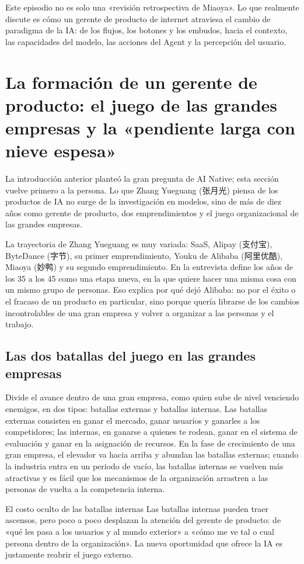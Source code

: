 \documentclass[a4paper]{article}
\begin{document}
Este episodio no es solo una «revisión retrospectiva de Miaoya». Lo que realmente discute es cómo un gerente de producto de internet atraviesa el cambio de paradigma de la IA: de los flujos, los botones y los embudos, hacia el contexto, las capacidades del modelo, las acciones del Agent y la percepción del usuario.
\section{La formación de un gerente de producto: el juego de las grandes empresas y la «pendiente larga con nieve espesa»}

La introducción anterior planteó la gran pregunta de AI Native; esta sección vuelve primero a la persona. Lo que Zhang Yueguang (张月光) piensa de los productos de IA no surge de la investigación en modelos, sino de más de diez años como gerente de producto, dos emprendimientos y el juego organizacional de las grandes empresas.

La trayectoria de Zhang Yueguang es muy variada: SaaS, Alipay (支付宝), ByteDance (字节), su primer emprendimiento, Youku de Alibaba (阿里优酷), Miaoya (妙鸭) y su segundo emprendimiento. En la entrevista define los años de los 35 a los 45 como una etapa nueva, en la que quiere hacer una misma cosa con un mismo grupo de personas. Eso explica por qué dejó Alibaba: no por el éxito o el fracaso de un producto en particular, sino porque quería librarse de los cambios incontrolables de una gran empresa y volver a organizar a las personas y el trabajo.

\subsection{Las dos batallas del juego en las grandes empresas}

Divide el avance dentro de una gran empresa, como quien sube de nivel venciendo enemigos, en dos tipos: batallas externas y batallas internas. Las batallas externas consisten en ganar el mercado, ganar usuarios y ganarles a los competidores; las internas, en ganarse a quienes te rodean, ganar en el sistema de evaluación y ganar en la asignación de recursos. En la fase de crecimiento de una gran empresa, el elevador va hacia arriba y abundan las batallas externas; cuando la industria entra en un periodo de vacío, las batallas internas se vuelven más atractivas y es fácil que los mecanismos de la organización arrastren a las personas de vuelta a la competencia interna.

\begin{warningbox}{El costo oculto de las batallas internas}
Las batallas internas pueden traer ascensos, pero poco a poco desplazan la atención del gerente de producto: de «qué les pasa a los usuarios y al mundo exterior» a «cómo me ve tal o cual persona dentro de la organización». La nueva oportunidad que ofrece la IA es justamente reabrir el juego externo.
\end{warningbox}
\end{document}
